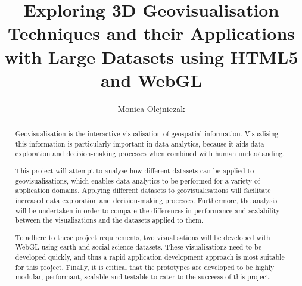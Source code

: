 \documentclass[
	fontsize=11pt
	headlines=2,
	footlines=2,
	parskip=half
]{scrartcl}
\title{Exploring 3D Geovisualisation Techniques and their Applications with Large Datasets using HTML5 and WebGL}
\author{Monica Olejniczak}
\begin{document}
	\makeatletter
		\textbf{\LARGE\textsf{\@title}}
		\vspace{-8pt}
		\begin{center}
			\large\textbf{\textsf{\@author}}
		\end{center}
		\vspace{-24pt}
	\makeatother

	\begin{abstract}
		Geovisualisation is the interactive visualisation of geospatial information. Visualising this information is particularly important in data analytics, because it aids data exploration and decision-making processes when combined with human understanding.

		This project will attempt to analyse how different datasets can be applied to geovisualisations, which enables data analytics to be performed for a variety of application domains. Applying different datasets to geovisualisations will facilitate increased data exploration and decision-making processes. Furthermore, the analysis will be undertaken in order to compare the differences in performance and scalability between the visualisations and the datasets applied to them.

		To adhere to these project requirements, two visualisations will be developed with WebGL using earth and social science datasets. These visualisations need to be developed quickly, and thus a rapid application development approach is most suitable for this project. Finally, it is critical that the prototypes are developed to be highly modular, performant, scalable and testable to cater to the succeess of this project.
	\end{abstract}
	
\end{document}
